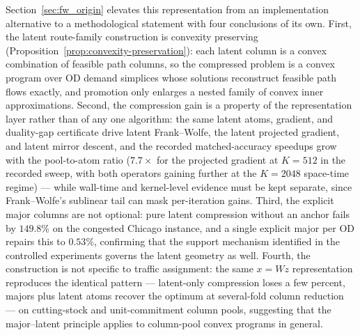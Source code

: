 
Section~\ref{sec:fw_origin} elevates this representation from an implementation alternative to a methodological statement with four conclusions of its own. First, the latent route-family construction is convexity preserving (Proposition~\ref{prop:convexity-preservation}): each latent column is a convex combination of feasible path columns, so the compressed problem is a convex program over OD demand simplices whose solutions reconstruct feasible path flows exactly, and promotion only enlarges a nested family of convex inner approximations. Second, the compression gain is a property of the representation layer rather than of any one algorithm: the same latent atoms, gradient, and duality-gap certificate drive latent Frank--Wolfe, the latent projected gradient, and latent mirror descent, and the recorded matched-accuracy speedups grow with the pool-to-atom ratio ($7.7\times$ for the projected gradient at $K=512$ in the recorded sweep, with both operators gaining further at the $K=2048$ space-time regime) --- while wall-time and kernel-level evidence must be kept separate, since Frank--Wolfe's sublinear tail can mask per-iteration gains. Third, the explicit major columns are not optional: pure latent compression without an anchor fails by $149.8\%$ on the congested Chicago instance, and a single explicit major per OD repairs this to $0.53\%$, confirming that the support mechanism identified in the controlled experiments governs the latent geometry as well. Fourth, the construction is not specific to traffic assignment: the same $x = Wz$ representation reproduces the identical pattern --- latent-only compression loses a few percent, majors plus latent atoms recover the optimum at several-fold column reduction --- on cutting-stock and unit-commitment column pools, suggesting that the major--latent principle applies to column-pool convex programs in general.
